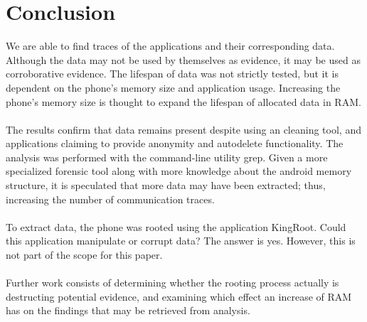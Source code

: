 \section{Conclusion}
We are able to find traces of the applications and their corresponding data. Although the data may not be used by themselves as evidence, it may be used as corroborative evidence. The lifespan of data was not strictly tested, but it is dependent on the phone's memory size and application usage. Increasing the phone's memory size is thought to expand the lifespan of allocated data in RAM.\\\\
The results confirm that data remains present despite using an cleaning tool, and applications claiming to provide anonymity and autodelete functionality. The analysis was performed with the command-line utility grep. Given a more specialized forensic tool along with more knowledge about the android memory structure, it is speculated that more data may have been extracted; thus, increasing the number of communication traces.\\\\
To extract data, the phone was rooted using the application KingRoot. Could this application manipulate or corrupt data? The answer is yes. However, this is not part of the scope for this paper.\\\\
Further work consists of determining whether the rooting process actually is destructing potential evidence, and examining which effect an increase of RAM has on the findings that may be retrieved from analysis.